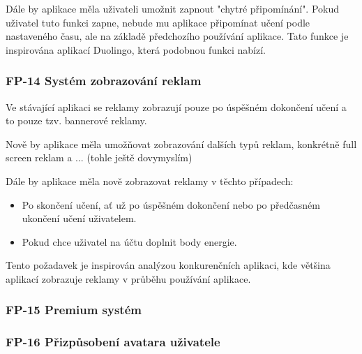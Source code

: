 Dále by aplikace měla uživateli umožnit zapnout "chytré připomínání". Pokud uživatel tuto funkci zapne, nebude mu aplikace připomínat učení podle nastaveného času, ale na základě předchozího používání aplikace. Tato funkce je inspirována aplikací Duolingo, která podobnou funkci nabízí.

\subsubsection{FP-14 Systém zobrazování reklam}

Ve stávající aplikaci se reklamy zobrazují pouze po úspěšném dokončení učení a to pouze tzv. bannerové reklamy. %

Nově by aplikace měla umožňovat zobrazování dalších typů reklam, konkrétně full screen reklam a ... (tohle ještě dovymyslím) %

Dále by aplikace měla nově zobrazovat reklamy v těchto případech:

\begin{itemize}
    \item Po skončení učení, ať už po úspěšném dokončení nebo po předčasném ukončení učení uživatelem.
    \item Pokud chce uživatel na účtu doplnit body energie.
\end{itemize}

Tento požadavek je inspirován analýzou konkurenčních aplikaci, kde většina aplikací zobrazuje reklamy v průběhu používání aplikace.

\subsubsection{FP-15 Premium systém}


\subsubsection{FP-16 Přizpůsobení avatara uživatele}

